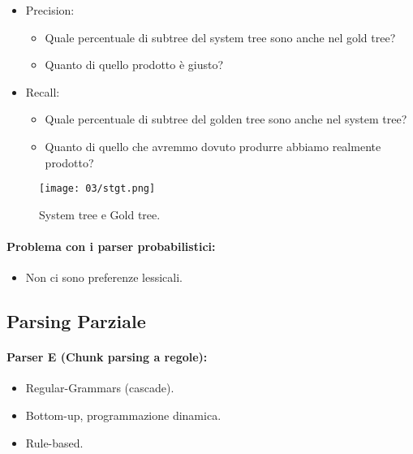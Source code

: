 \begin{itemize}
  \item Precision: 
    \begin{itemize}
      \item Quale percentuale di subtree del system tree sono anche nel gold tree?
      \item Quanto di quello prodotto è giusto?
    \end{itemize}
  \item Recall:
    \begin{itemize}
      \item Quale percentuale di subtree del golden tree sono anche nel system tree?
      \item Quanto di quello che avremmo dovuto produrre abbiamo realmente prodotto?
    \end{itemize}
\end{itemize}

\begin{figure}[!h]
    \centering
    \texttt{[image: 03/stgt.png]}
    \caption{System tree e Gold tree.}
\end{figure}

\paragraph{Problema con i parser probabilistici:}

\begin{itemize}
  \item Non ci sono preferenze lessicali.
\end{itemize}


\subsection{Parsing Parziale}

\paragraph{Parser E (Chunk parsing a regole):}

\begin{itemize}
  \item Regular-Grammars (cascade). 
  \item Bottom-up, programmazione dinamica. 
  \item Rule-based.
\end{itemize}

